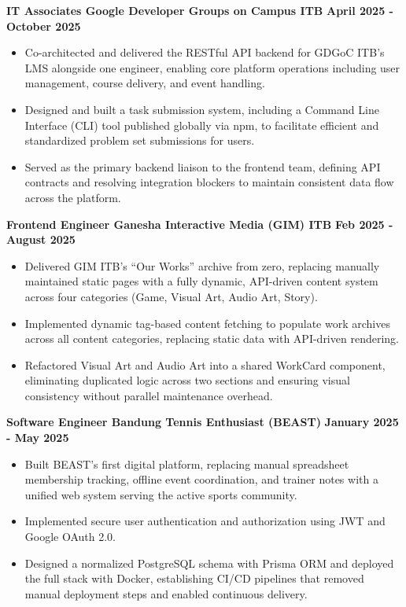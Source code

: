\documentclass[10pt, a4paper]{article}
\begin{document}
\vspace{4pt}
\noindent
\textbf{IT Associates \textbar{} Google Developer Groups on Campus ITB} \hfill \textbf{April 2025 - October 2025}
\begin{itemize}[leftmargin=0.25in, topsep=2pt, itemsep=0pt, parsep=2pt]
    \item Co-architected and delivered the RESTful API backend for GDGoC ITB's LMS alongside one engineer, enabling core platform operations including user management, course delivery, and event handling.
    \item Designed and built a task submission system, including a Command Line Interface (CLI) tool published globally via npm, to facilitate efficient and standardized problem set submissions for users.
    \item Served as the primary backend liaison to the frontend team, defining API contracts and resolving integration blockers to maintain consistent data flow across the platform.
\end{itemize}

\vspace{4pt}
\noindent
\textbf{Frontend Engineer \textbar{} Ganesha Interactive Media (GIM) ITB} \hfill \textbf{Feb 2025 - August 2025}
\begin{itemize}[leftmargin=0.25in, topsep=2pt, itemsep=0pt, parsep=2pt]
    \item Delivered GIM ITB's ``Our Works'' archive from zero, replacing manually maintained static pages with a fully dynamic, API-driven content system across four categories (Game, Visual Art, Audio Art, Story).
    \item Implemented dynamic tag-based content fetching to populate work archives across all content categories, replacing static data with API-driven rendering.
    \item Refactored Visual Art and Audio Art into a shared WorkCard component, eliminating duplicated logic across two sections and ensuring visual consistency without parallel maintenance overhead.
\end{itemize}

\vspace{4pt}
\noindent
\textbf{Software Engineer \textbar{} Bandung Tennis Enthusiast (BEAST)} \hfill \textbf{January 2025 - May 2025}
\begin{itemize}[leftmargin=0.25in, topsep=2pt, itemsep=0pt, parsep=2pt]
    \item Built BEAST's first digital platform, replacing manual spreadsheet membership tracking, offline event coordination, and trainer notes with a unified web system serving the active sports community.
    \item Implemented secure user authentication and authorization using JWT and Google OAuth 2.0.
    \item Designed a normalized PostgreSQL schema with Prisma ORM and deployed the full stack with Docker, establishing CI/CD pipelines that removed manual deployment steps and enabled continuous delivery.
\end{itemize}
\end{document}
